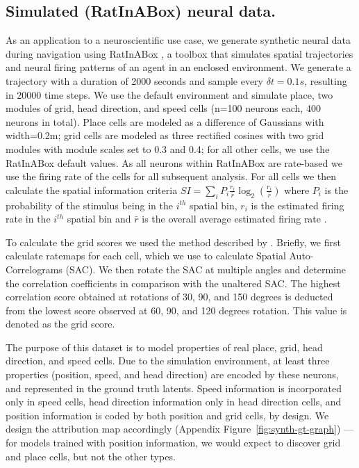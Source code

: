   
        

\subsection{Simulated (RatInABox) neural data.}
    \label{app:ratinabox}
    
    As an application to a neuroscientific use case, we generate synthetic neural data during navigation using RatInABox \citep{george2022ratinabox}, a toolbox that simulates spatial trajectories and neural firing patterns of an agent in an enclosed environment. We generate a trajectory with a duration of 2000 seconds and sample every $\delta t=0.1s$, resulting in 20000 time steps. We use the default environment and simulate place, two modules of grid, head direction, and speed cells (n=100 neurons each, 400 neurons in total). Place cells are modeled as a difference of Gaussians with width=0.2m; grid cells are modeled as three rectified cosines with two grid modules with module scales set to 0.3 and 0.4; for all other cells, we use the RatInABox default values. As all neurons within RatInABox are rate-based we use the firing rate of the cells for all subsequent analysis. For all cells we then calculate the spatial information criteria $SI = \sum_{i} P_i \frac{r_i}{\bar{r}} \log_2 \left( \frac{r_i}{\bar{r}} \right)$
    where \( P_i \) is the probability of the stimulus being in the \(i^{th}\) spatial bin, \( r_i \) is the estimated firing rate in the \(i^{th}\) spatial bin and \( \bar{r} \) is the overall average estimated firing rate \citep{skaggs1996theta}. 

    To calculate the grid scores we used the method described by \citet{sargolini2006conjunctive}. Briefly, we first calculate ratemaps for each cell, which we use to calculate Spatial Auto-Correlograms (SAC). We then rotate the SAC at multiple angles and determine the correlation coefficients in comparison with the unaltered SAC. The highest correlation score obtained at rotations of 30, 90, and 150 degrees is deducted from the lowest score observed at 60, 90, and 120 degrees rotation. This value is denoted as the grid score. 

    The purpose of this dataset is to model properties of real place, grid, head direction, and speed cells. Due to the simulation environment, at least three properties (position, speed, and head direction) are encoded by these neurons, and represented in the ground truth latents. Speed information is incorporated only in speed cells, head direction information only in head direction cells, and position information is coded by both position and grid cells, by design. We design the attribution map accordingly (Appendix Figure~\ref{fig:synth-gt-graph}) --- for models trained with position information, we would expect to discover grid and place cells, but not the other types.
    
